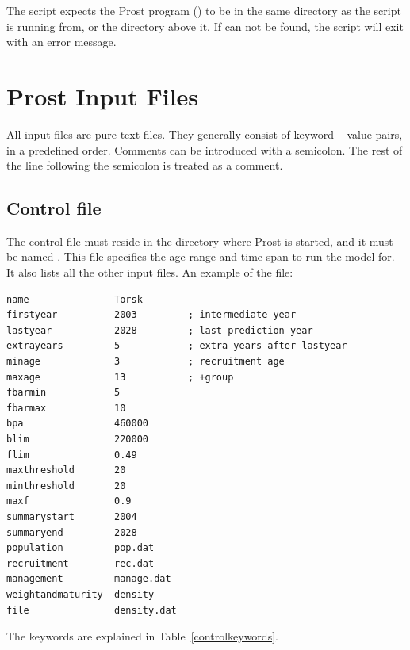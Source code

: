\documentclass[12pt,twoside,a4paper]{article}
\begin{document}
The script expects the Prost program () to be in the
same directory as the script is running from, or the directory above
it. If  can not be found, the script will exit with an
error message.

\section{Prost Input Files}
\label{input}
All input files are pure text files. They generally consist of keyword
-- value pairs, in a predefined order. Comments can be introduced with
a semicolon. The rest of the line following the semicolon is treated
as a comment.

\subsection{Control file}
\label{control}
The control file must reside in the directory where Prost is started,
and it must be named .  This file specifies the age range and
time span to run the model for. It also lists all the other input
files. An example of the file:
\begin{verbatim}
name               Torsk
firstyear          2003         ; intermediate year
lastyear           2028         ; last prediction year
extrayears         5            ; extra years after lastyear
minage             3            ; recruitment age
maxage             13           ; +group
fbarmin            5
fbarmax            10
bpa                460000
blim               220000
flim               0.49
maxthreshold       20
minthreshold       20
maxf               0.9
summarystart       2004
summaryend         2028
population         pop.dat
recruitment        rec.dat
management         manage.dat
weightandmaturity  density 
file               density.dat
\end{verbatim}

The keywords are explained in Table~\ref{controlkeywords}.
\end{document}
